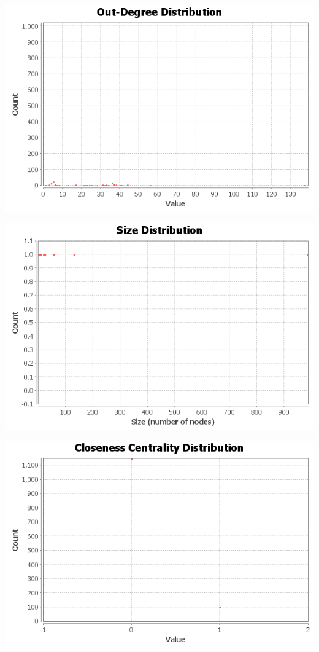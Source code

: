 \documentclass{article}
\begin{document}
\includegraphics[scale=.5]{outdegree-distribution.png} \\
\graphicspath{{q3/connected/}}
\includegraphics[scale=.5]{cc-size-distribution.png} \\
\graphicspath{{q3/diameter/}}
\includegraphics[scale=.5]{ClosenessCentralityDistribution.png} \\
\end{document}

